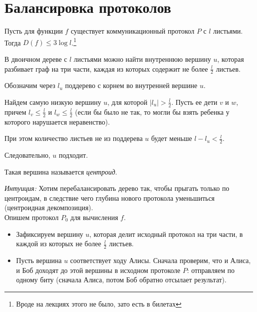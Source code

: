 \section{Балансировка протоколов}
\begin{thm}
	Пусть для функции $ f$ существует коммуникационный протокол $ P$ с $ l$ листьями. Тогда  $ D(f) \le 3 \log l$.\footnote{Вроде на лекциях этого не было, зато есть в билетах}
\end{thm}
\begin{proof*}
	\begin{lm}
	    В двоичном дереве с $ l$ листьями можно найти внутреннюю вершину  $ u$, которая разбивает граф на три части, каждая из которых содержит не более   $ \frac{l}{2}$ листьев.
	\end{lm}
	\begin{proof*}
	    Обозначим через $ l_u$ поддерево с корнем во внутренней вершине $ u$.

		Найдем самую низкую вершину $ u$, для которой  $  \lvert l_u \rvert > \frac{l}{2}$. Пусть ее дети $ v $ и  $ w$, причем $ l_v \le \frac{l}{2}$  и $ l_w \le \frac{l}{2}$ (если бы было не так, то могли бы взять ребенка у которого нарушается неравенство).

		При этом количество листьев не из поддерева $ u$ будет меньше  $ l - l_u < \frac{l}{2}$.

		Следовательно, $ u$ подходит.
	\end{proof*}
	
	\begin{note}
	Такая вершина называется \textit{центроид}.
	\end{note}
	
	\vspace{1em}
	\textit{Интуиция:} Хотим перебалансировать дерево так, чтобы прыгать только по центроидам, в следствие чего глубина нового протокола уменьшиться (центроидная декомпозиция).\\

    Опишем протокол $ P_0$ для вычисления  $ f$. 

	\begin{itemize}
		\item Зафиксируем вершину $ u$, которая делит исходный протокол на три части, в каждой из которых не более $  \frac{l}{2}$ листьев.
		\item Пусть вершина $ u$ соответствует ходу Алисы. 
			Сначала проверим, что и Алиса, и Боб доходят до этой вершины в исходном протоколе $ P$: отправляем по одному биту (сначала Алиса, потом Боб обратно отсылает результат).


\end{itemize}
\end{proof*}

